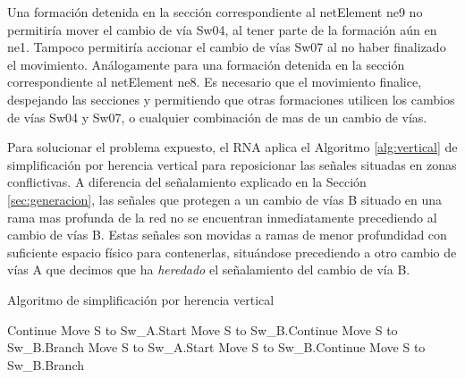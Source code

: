 	Una formación detenida en la sección correspondiente al netElement ne9 no permitiría mover el cambio de vía Sw04, al tener parte de la formación aún en ne1. Tampoco permitiría accionar el cambio de vías Sw07 al no haber finalizado el movimiento. Análogamente para una formación detenida en la sección correspondiente al netElement ne8. Es necesario que el movimiento finalice, despejando las secciones y permitiendo que otras formaciones utilicen los cambios de vías Sw04 y Sw07, o cualquier combinación de mas de un cambio de vías.
	
	Para solucionar el problema expuesto, el RNA aplica el Algoritmo \ref{alg:vertical} de simplificación por herencia vertical para reposicionar las señales situadas en zonas conflictivas. A diferencia del señalamiento explicado en la Sección \ref{sec:generacion}, las señales que protegen a un cambio de vías B situado en una rama mas profunda de la red no se encuentran inmediatamente precediendo al cambio de vías B. Estas señales son movidas a ramas de menor profundidad con suficiente espacio físico para contenerlas, situándose precediendo a otro cambio de vías A que decimos que ha \emph{heredado} el señalamiento del cambio de vía B.
		
	\begin{algorithm}[hbt!]
        \caption{Algoritmo de simplificación por herencia vertical}\label{alg:vertical}
        \DontPrintSemicolon
        \SetNoFillComment
        \LinesNotNumbered 
        {
            {
                {
                    Continue\;
                }
                {
                   {
                        Move S to Sw\_A.Start\;
                   }
                   {
                        Move S to Sw\_B.Continue\;
                        Move S to Sw\_B.Branch\;
                   }
                }
                {
                   {
                        Move S to Sw\_A.Start\;
                   }
                   {
                        Move S to Sw\_B.Continue\;
                        Move S to Sw\_B.Branch\;
                   }
                }
            }
        
        }
        \KwResult{[Signals]} 
    \end{algorithm}

